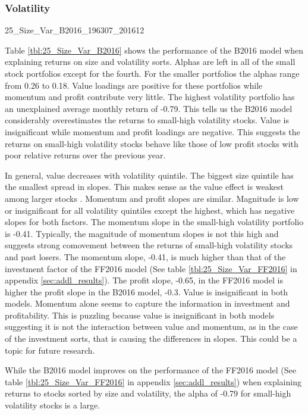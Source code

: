 
\subsubsection{Volatility}

{25_Size_Var_B2016_196307_201612}

Table \ref{tbl:25_Size_Var_B2016} shows the performance of the B2016 model when
explaining returns on size and volatility sorts. Alphas are left in all of the small stock
portfolios except for the fourth. For the smaller portfolios the alphas range from 0.26 to
0.18. Value loadings are positive for these portfolios while momentum and profit
contribute very little. The highest volatility portfolio has an unexplained average
monthly return of -0.79. This tells us the B2016 model considerably overestimates the
returns to small-high volatility stocks. Value is insignificant while momentum and profit
loadings are negative. This suggests the returns on small-high volatility stocks behave
like those of low profit stocks with poor relative returns over the previous year.

In general, value decreases with volatility quintile. The biggest size quintile has the
smallest spread in slopes. This makes sense as the value effect is weakest among larger
stocks \parencite{asness2015fact}. Momentum and profit slopes are similar. Magnitude is
low or insignificant for all volatility quintiles except the highest, which has negative
slopes for both factors. The momentum slope in the small-high volatility portfolio is
-0.41. Typically, the magnitude of momentum slopes is not this high and suggests strong
comovement between the returns of small-high volatility stocks and past losers. The
momentum slope, -0.41, is much higher than that of the investment factor of the FF2016
model (See table \ref{tbl:25_Size_Var_FF2016} in appendix \ref{sec:addl_results}). The
profit slope, -0.65, in the FF2016 model is higher the profit slope in the B2016 model,
-0.3. Value is insignificant in both models. Momentum alone seems to capture the
information in investment and profitability. This is puzzling because value is
insignificant in both models suggesting it is not the interaction between value and
momentum, as in the case of the investment sorts, that is causing the differences in
slopes. This could be a topic for future research.

While the B2016 model improves on the performance of the FF2016 model (See table
\ref{tbl:25_Size_Var_FF2016} in appendix \ref{sec:addl_results}) when explaining returns
to stocks sorted by size and volatility, the alpha of -0.79 for small-high volatility
stocks is a large.